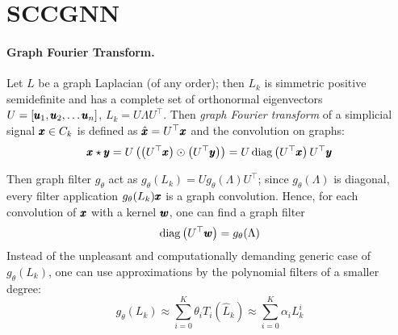 \documentclass{mynotes}
\begin{document}
\section{ SCCGNN }


\begin{comment}
Let \( C_k \) be a formal linear space on \( \V k \).

We consider a semi-supervised setting\todo{I am not clear on terms: is it semi-supervised if not the dominant share of values is missing?}: we have the flow \( \b x \in C_1 \) with a share of missing values; the goal is to reconstruct the missing values (let \( \nu \) be the share of the missing values; missing entries in \( \b x \) are filled with the median\todo{or \( 0 \)} value of the present values).
\end{comment}

\paragraph{Graph Fourier Transform. }

Let \( L \) be a graph Laplacian (of any order); then \( L_k \) is simmetric positive semidefinite and has a complete set of orthonormal eigenvectors \( U = [ \pmb{u}_1, \pmb{u}_2, \ldots \pmb{u}_n ]\), \( L_k = U \Lambda U^\top \). Then \emph{graph Fourier transform } of a simplicial signal \( \pmb{x} \in C_k \) is defined as \( \hat{ \pmb{x} } = U^\top \pmb{x} \) and the convolution on graphs:
\begin{equation}
      \pmb{x} \star \pmb{y} = U \left(  \left( U^\top \pmb{x} \right)  \odot \left( U^\top \pmb{y} \right) \right) = U \operatorname{diag} \left( U^\top \pmb{x} \right) U^\top \pmb{y}
\end{equation}

Then graph filter \( g_\theta \) act as \( g_\theta ( L_k ) = U g_\theta ( \Lambda ) U^\top \); since \( g_\theta ( \Lambda ) \) is diagonal, every filter application \( g_\theta (L_k) \pmb{x} \) is a graph convolution. Hence, for each convolution of \( \pmb{x} \) with a kernel \( \pmb{w} \), one can find a graph filter
\begin{equation}
      \operatorname{diag} \left( U^\top \pmb{w} \right) = g_\theta ( \Lambda )
\end{equation}
Instead of the unpleasant and computationally demanding generic case of \( g_\theta (L_k) \), one can use approximations by the polynomial filters of a smaller degree:
\begin{equation}
      g_\theta (L_k ) \approx \sum_{i=0}^K \theta_i T_i ( \hat L_k ) \approx   \sum_{i=0}^K \alpha_i L_k^i
\end{equation}
\end{document}
